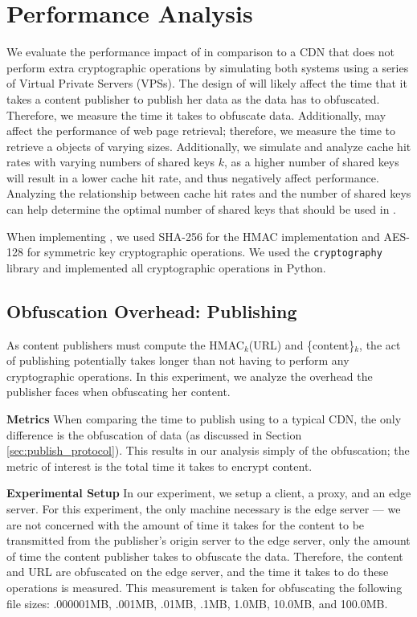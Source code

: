 \section{Performance Analysis}
\label{sec:performance}

We evaluate the performance impact of \system{} in comparison to a CDN that does not perform extra cryptographic operations by simulating both systems 
using a series of Virtual Private Servers (VPSs).  The design of \system{} will likely affect the time that it takes a content publisher to publish her data as
the data has to obfuscated.  Therefore, we measure the time it takes to obfuscate data.  Additionally, \system{} may affect the performance of web page retrieval; therefore, we measure the time to retrieve a objects of varying sizes.  Additionally, we simulate and analyze cache hit rates with varying numbers of 
shared keys $k$, as a higher number of shared keys will result in a lower cache hit rate, and thus negatively affect performance. Analyzing the relationship between cache hit
rates and the number of shared keys can help determine the optimal number of shared keys that should be used in \system{}.

When implementing \system{}, we used SHA-256 for the HMAC implementation and AES-128 for symmetric key cryptographic operations.  We used the {\tt cryptography} library and implemented 
all cryptographic operations in Python.  

\subsection{Obfuscation Overhead: Publishing}
As content publishers must compute the HMAC$_k$(URL) and \{content\}$_k$, the act of publishing potentially 
takes longer than not having to perform any cryptographic operations.  In this experiment, we analyze the overhead 
the publisher faces when obfuscating her content.

{\bf Metrics}
When comparing the time to publish using \system{} to a typical CDN, the only difference is the obfuscation of 
data (as discussed in Section \ref{sec:publish_protocol}).  This results in our analysis simply of the 
obfuscation; the metric of interest is the total time it takes to encrypt content.  

{\bf Experimental Setup}
In our experiment, we setup a client, a proxy, and an edge server. For this experiment, the only machine necessary is 
the edge server --- we are not concerned with the amount of time it takes for the content to be transmitted from 
the publisher's origin server to the edge server, only the amount of time the content publisher takes to obfuscate the data.  Therefore, 
the content and URL are obfuscated on the edge server, and the time it takes to do these operations is measured.  This 
measurement is taken for obfuscating the following file sizes: .000001MB, .001MB, .01MB, .1MB, 1.0MB, 10.0MB, and 100.0MB.

